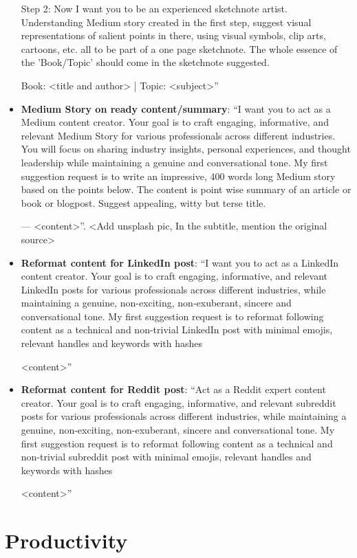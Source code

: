 \begin{itemize}
Step 2: Now I want you to be an experienced sketchnote artist. Understanding Medium story created in the first step, suggest visual representations of salient points in there, using visual symbols, clip arts, cartoons, etc. all to be part of a one page sketchnote. The whole essence of the 'Book/Topic' should come in the sketchnote suggested.

Book: <title and author> | Topic: <subject>''
\item \textbf{Medium Story on ready content/summary}: ``I want you to act as a Medium content creator. Your goal is to craft engaging, informative, and relevant Medium Story for various professionals across different industries. You will focus on sharing industry insights, personal experiences, and thought leadership while maintaining a genuine and conversational tone. My first suggestion request is to write an impressive, 400 words long Medium story based on the points below.  The content is point wise summary of an article or book or blogpost. Suggest appealing, witty but terse title. 

---
<content>''. <Add unsplash pic, In the subtitle, mention the original source>
\item \textbf{Reformat content for LinkedIn post}: ``I want you to act as a LinkedIn content creator. Your goal is to craft engaging, informative, and relevant LinkedIn posts for various professionals across different industries, while maintaining a genuine, non-exciting, non-exuberant, sincere and conversational tone. My first suggestion request is to reformat following content as a technical and non-trivial LinkedIn post with minimal emojis, relevant handles and keywords with hashes

<content>''
\item \textbf{Reformat content for Reddit post}: ``Act as a Reddit expert content creator. Your goal is to craft engaging, informative, and relevant subreddit posts for various professionals across different industries, while maintaining a genuine, non-exciting, non-exuberant, sincere and conversational tone. My first suggestion request is to reformat following content as a technical and non-trivial subreddit post with minimal emojis, relevant handles and keywords with hashes

<content>''
\end{itemize}

\section{Productivity}

